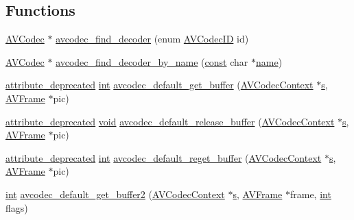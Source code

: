 \subsection*{Functions}
\begin{DoxyCompactItemize}
\item 
\hyperlink{struct_a_v_codec}{A\+V\+Codec} $\ast$ \hyperlink{group__lavc__decoding_ga19a0ca553277f019dd5b0fec6e1f9dca}{avcodec\+\_\+find\+\_\+decoder} (enum \hyperlink{group__lavc__core_gaadca229ad2c20e060a14fec08a5cc7ce}{A\+V\+Codec\+ID} id)
\item 
\hyperlink{struct_a_v_codec}{A\+V\+Codec} $\ast$ \hyperlink{group__lavc__decoding_ga776f2359007e8457799503068419e791}{avcodec\+\_\+find\+\_\+decoder\+\_\+by\+\_\+name} (\hyperlink{getopt1_8c_a2c212835823e3c54a8ab6d95c652660e}{const} char $\ast$\hyperlink{lib_2expat_8h_a1b49b495b59f9e73205b69ad1a2965b0}{name})
\item 
\hyperlink{attributes_8h_aa6d076561d3a9eea4729ee632652de02}{attribute\+\_\+deprecated} \hyperlink{xmltok_8h_a5a0d4a5641ce434f1d23533f2b2e6653}{int} \hyperlink{group__lavc__decoding_ga666e4cc55f8a14c3b1ea66aaef2f6970}{avcodec\+\_\+default\+\_\+get\+\_\+buffer} (\hyperlink{struct_a_v_codec_context}{A\+V\+Codec\+Context} $\ast$\hyperlink{lib_2expat_8h_a755339d27872b13735c2cab829e47157}{s}, \hyperlink{struct_a_v_frame}{A\+V\+Frame} $\ast$pic)
\item 
\hyperlink{attributes_8h_aa6d076561d3a9eea4729ee632652de02}{attribute\+\_\+deprecated} \hyperlink{sound_8c_ae35f5844602719cf66324f4de2a658b3}{void} \hyperlink{group__lavc__decoding_ga4544e55d2417bfe6e746dcaf2195dde0}{avcodec\+\_\+default\+\_\+release\+\_\+buffer} (\hyperlink{struct_a_v_codec_context}{A\+V\+Codec\+Context} $\ast$\hyperlink{lib_2expat_8h_a755339d27872b13735c2cab829e47157}{s}, \hyperlink{struct_a_v_frame}{A\+V\+Frame} $\ast$pic)
\item 
\hyperlink{attributes_8h_aa6d076561d3a9eea4729ee632652de02}{attribute\+\_\+deprecated} \hyperlink{xmltok_8h_a5a0d4a5641ce434f1d23533f2b2e6653}{int} \hyperlink{group__lavc__decoding_ga3f7158d88758be42cc1ab6b9e6df9f0d}{avcodec\+\_\+default\+\_\+reget\+\_\+buffer} (\hyperlink{struct_a_v_codec_context}{A\+V\+Codec\+Context} $\ast$\hyperlink{lib_2expat_8h_a755339d27872b13735c2cab829e47157}{s}, \hyperlink{struct_a_v_frame}{A\+V\+Frame} $\ast$pic)
\item 
\hyperlink{xmltok_8h_a5a0d4a5641ce434f1d23533f2b2e6653}{int} \hyperlink{group__lavc__decoding_ga09dee227d3666720eff1f6913d11699d}{avcodec\+\_\+default\+\_\+get\+\_\+buffer2} (\hyperlink{struct_a_v_codec_context}{A\+V\+Codec\+Context} $\ast$\hyperlink{lib_2expat_8h_a755339d27872b13735c2cab829e47157}{s}, \hyperlink{struct_a_v_frame}{A\+V\+Frame} $\ast$frame, \hyperlink{xmltok_8h_a5a0d4a5641ce434f1d23533f2b2e6653}{int} flags)

\end{DoxyCompactItemize}
